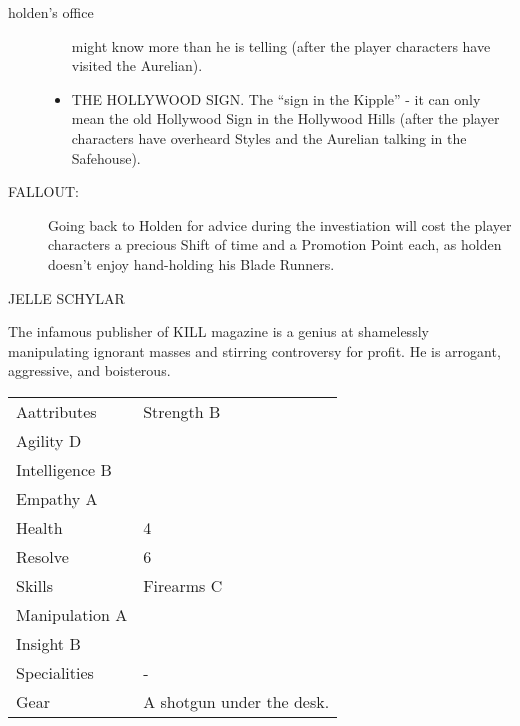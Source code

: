 \documentclass{book}
\begin{document}
\begin{locationbox}{holden's office}
\begin{multicols}{2}
\begin{description}
\begin{itemize}
						might know more than he is
						telling (after the player
							characters have visited
						the Aurelian).
					\item[\color{titlered}{$\blackinwhitesquare$}]
						{\color{titlered} THE
						HOLLYWOOD SIGN. }
						The ``sign in the Kipple'' - it
						can only mean the old Hollywood
						Sign in the Hollywood Hills
						(after the player characters
							have overheard Styles
							and the Aurelian talking
						in the Safehouse).
				\end{itemize}
			\item[\textsf{\color{titlered}FALLOUT:}]
				Going back to Holden for advice during the
				investiation will cost the player characters a
				precious Shift of time and a Promotion Point
				each, as holden doesn't enjoy hand-holding his
				Blade Runners.
		\end{description}
	\end{multicols}
	\end{locationbox}
	
	\begin{npc}{JELLE SCHYLAR}
		\begin{multicols}{2}
		The infamous publisher of KILL magazine is a genius at shamelessly manipulating ignorant masses and stirring controversy for profit. He is arrogant, aggressive, and boisterous.
		\end{multicols}
		\begin{tcolorbox}[
				notitle,
				sidebyside,
				colframe=\colback,
				sharp corners=all
			]
		\begin{tabularx}{3 in}{l S}
			Aattributes & 
				Strength B\\
				Agility D\\
				Intelligence B\\
				Empathy A\tabularnewline
			\hline
			Health & 4 \tabularnewline
			\hline
			Resolve & 6 \tabularnewline
			\hline
			Skills &
				Firearms C\\
				Manipulation A\\
				Insight B\tabularnewline
			\hline
			Specialities & - \tabularnewline
			\hline
			Gear & A shotgun under the desk.\tabularnewline
		\end{tabularx}
		\tcblower
		\end{tcolorbox}
	\end{npc}
\end{document}

